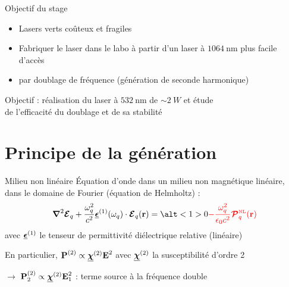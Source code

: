 \documentclass{beamer}
\newcommand{\lmbd}[1]{\SI{#1}{\nano\metre}}
\begin{document}
{\begin{frame}{Objectif du stage}
\begin{itemize}
\item Lasers verts coûteux et fragiles
\item Fabriquer le laser dans le labo à partir d'un laser à $\lmbd{1064}$ plus facile d'accès
\item par doublage de fréquence (génération de seconde harmonique)
\end{itemize}
\begin{beamerboxesrounded}[width=0.9\textwidth]{}
Objectif : réalisation du laser à $\lmbd{532}$ de $\sim\SI{2}{W}$ et étude\\de l'efficacité du doublage et de sa stabilité
\end{beamerboxesrounded} %
\end{frame}

}

\section{Principe de la génération}

\begin{frame}{Milieu non linéaire}
Équation d'onde dans un milieu non magnétique  linéaire,\\ dans le domaine de Fourier (équation de Helmholtz) :
\begin{equation*}
\boldsymbol{\nabla}^2 \boldsymbol{\E}_q + \frac{\omega_q^2}{c^2}\tens\epsilon^{(1)}(\omega_q)\cdot \v \E_q(\v r) = \alt<1>{0}{{\textcolor{red}{- \frac{\omega_q^2}{\epsilon_0 c^2} \boldsymbol{\mathcal{P}}^\mathsc{NL}_q(\v r) }} }
\end{equation*}
avec $\boldsymbol{\underline{\epsilon}}^{(1)}$ le tenseur de permittivité diélectrique relative (linéaire)\\

\pause
En particulier, $\boldsymbol{\mathbf{P}}^{(2)} \propto \boldsymbol{\underline{\chi}}^{(2)} \boldsymbol{\mathbf{E}}^2$ avec $\boldsymbol{\underline{\chi}}^{(2)}$ la susceptibilité d'ordre 2

$\rightarrow$ $\boldsymbol{\mathbf{P}}^{(2)}_2 \propto \boldsymbol{\underline{\chi}}^{(2)} \boldsymbol{\mathbf{E}}^2_1$ : terme source à la fréquence double
\end{frame}
\end{document}
